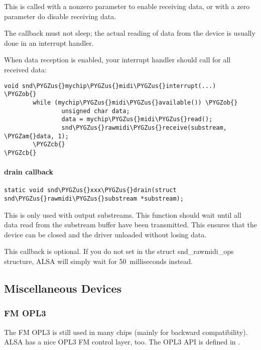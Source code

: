 \documentclass[a4paper,8pt,english]{sphinxmanual}
\def\PYGZus{\char`\_}
\def\PYGZob{\char`\{}
\def\PYGZcb{\char`\}}
\def\PYGZam{\char`\&}
\begin{document}
This is called with a nonzero  parameter to enable receiving data,
or with a zero  parameter do disable receiving data.

The  callback must not sleep; the actual reading of data
from the device is usually done in an interrupt handler.

When data reception is enabled, your interrupt handler should call
 for all received data:

\begin{Verbatim}[commandchars=\\\{\}]
void snd\PYGZus{}mychip\PYGZus{}midi\PYGZus{}interrupt(...)
\PYGZob{}
        while (mychip\PYGZus{}midi\PYGZus{}available()) \PYGZob{}
                unsigned char data;
                data = mychip\PYGZus{}midi\PYGZus{}read();
                snd\PYGZus{}rawmidi\PYGZus{}receive(substream, \PYGZam{}data, 1);
        \PYGZcb{}
\PYGZcb{}
\end{Verbatim}


\paragraph{drain callback}
\label{sound/kernel-api/writing-an-alsa-driver:drain-callback}
\begin{Verbatim}[commandchars=\\\{\}]
static void snd\PYGZus{}xxx\PYGZus{}drain(struct snd\PYGZus{}rawmidi\PYGZus{}substream *substream);
\end{Verbatim}

This is only used with output substreams. This function should wait
until all data read from the substream buffer have been transmitted.
This ensures that the device can be closed and the driver unloaded
without losing data.

This callback is optional. If you do not set  in the struct
snd\_rawmidi\_ops structure, ALSA will simply wait for 50 milliseconds
instead.


\subsection{Miscellaneous Devices}
\label{sound/kernel-api/writing-an-alsa-driver:miscellaneous-devices}

\subsubsection{FM OPL3}
\label{sound/kernel-api/writing-an-alsa-driver:fm-opl3}
The FM OPL3 is still used in many chips (mainly for backward
compatibility). ALSA has a nice OPL3 FM control layer, too. The OPL3 API
is defined in .
\end{document}

